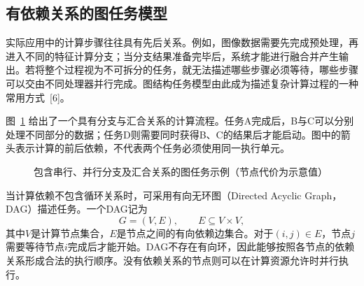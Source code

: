 \subsection{有依赖关系的图任务模型}

实际应用中的计算步骤往往具有先后关系。例如，图像数据需要先完成预处理，再进入不同的特征计算分支；当分支结果准备完毕后，系统才能进行融合并产生输出。若将整个过程视为不可拆分的任务，就无法描述哪些步骤必须等待，哪些步骤可以交由不同处理器并行完成。图结构任务模型由此成为描述复杂计算过程的一种常用方式~[6]。

图~\ref{fig:ch2_dag} 给出了一个具有分支与汇合关系的计算流程。任务A完成后，B与C可以分别处理不同部分的数据；任务D则需要同时获得B、C的结果后才能启动。图中的箭头表示计算的前后依赖，不代表两个任务必须使用同一执行单元。

\begin{figure}[htbp]
  \centering
  \caption{包含串行、并行分支及汇合关系的图任务示例（节点代价为示意值）}
  \label{fig:ch2_dag}
\end{figure}

当计算依赖不包含循环关系时，可采用有向无环图（Directed Acyclic Graph，DAG）描述任务。一个DAG记为
\begin{equation}\label{eq:ch2-dag}
  G=(V,E),\qquad E\subseteq V\times V,
\end{equation}
其中$V$是计算节点集合，$E$是节点之间的有向依赖边集合。对于$(i,j)\in E$，节点$j$需要等待节点$i$完成后才能开始。DAG不存在有向环，因此能够按照各节点的依赖关系形成合法的执行顺序。没有依赖关系的节点则可以在计算资源允许时并行执行。

